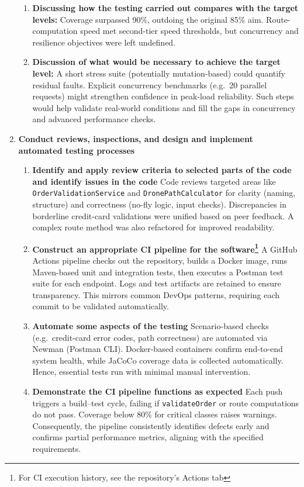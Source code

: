 \documentclass{article}
\begin{document}
\begin{enumerate}
\begin{enumerate}
\item \textbf{Discussing how the testing carried out compares with the target levels:}
Coverage surpassed 90\%, outdoing the original 85\% aim. 
Route-computation speed met second-tier speed thresholds,
but concurrency and resilience objectives were left undefined.

\item \textbf{Discussion of what would be necessary to achieve the target level:}
A short stress suite (potentially mutation-based) could quantify residual faults.
Explicit concurrency benchmarks (e.g.\ 20 parallel requests) might strengthen confidence in 
peak-load reliability. Such steps would help validate real-world conditions and fill the
gaps in concurrency and advanced performance checks.
\end{enumerate}

\item \textbf{Conduct reviews, inspections, and design and implement automated testing processes} \marginpar{[default 20\%]}
\begin{enumerate}
\item \textbf{Identify and apply review criteria to selected parts of the code and identify issues in the code}
Code reviews targeted areas like \texttt{OrderValidationService} and \texttt{DronePathCalculator} 
for clarity (naming, structure) and correctness (no-fly logic, input checks). 
Discrepancies in borderline credit-card validations were unified based on peer feedback.
A complex route method was also refactored for improved readability.

\item \textbf{Construct an appropriate CI pipeline for the software\footnote{For CI execution history, see the repository's Actions tab}}
A GitHub Actions pipeline checks out the repository, builds a Docker image, runs Maven-based unit and integration tests, 
then executes a Postman test suite for each endpoint. Logs and test artifacts are retained to ensure transparency. 
This mirrors common DevOps patterns, requiring each commit to be validated automatically.

\item\textbf{Automate some aspects of the testing}
Scenario-based checks (e.g.\ credit-card error codes, path correctness) are automated via Newman (Postman CLI). 
Docker-based containers confirm end-to-end system health, while JaCoCo coverage data is collected automatically. 
Hence, essential tests run with minimal manual intervention.

\item \textbf{Demonstrate the CI pipeline functions as expected}
Each push triggers a build–test cycle, failing if \texttt{validateOrder} or route computations do not pass. 
Coverage below 80\% for critical classes raises warnings. Consequently, the pipeline consistently identifies 
defects early and confirms partial performance metrics, aligning with the specified requirements.
\end{enumerate}
\end{enumerate}
\end{document}
